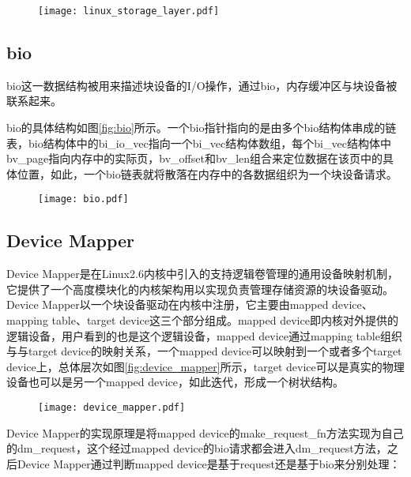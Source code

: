 \begin{figure}[H]
    \centering
    \texttt{[image: linux\_storage\_layer.pdf]}
\end{figure}

\subsection{bio}
\label{sec:bio}

bio这一数据结构被用来描述块设备的I/O操作，通过bio，内存缓冲区与块设备被联系起来\cite{corbet2005linux}。

bio的具体结构如图\ref{fig:bio}所示。一个bio指针指向的是由多个bio结构体串成的链表，bio结构体中的bi\_io\_vec指向一个bi\_vec结构体数组，每个bi\_vec结构体中bv\_page指向内存中的实际页，bv\_offset和bv\_len组合来定位数据在该页中的具体位置，如此，一个bio链表就将散落在内存中的各数据组织为一个块设备请求。

\begin{figure}[H]
    \centering
    \texttt{[image: bio.pdf]}
\end{figure}

\subsection{Device Mapper}

Device Mapper是在Linux2.6内核中引入的支持逻辑卷管理的通用设备映射机制，它提供了一个高度模块化的内核架构用以实现负责管理存储资源的块设备驱动\cite{bovet2005understanding}。Device Mapper以一个块设备驱动在内核中注册，它主要由mapped device、mapping table、target device这三个部分组成。mapped device即内核对外提供的逻辑设备，用户看到的也是这个逻辑设备，mapped device通过mapping table组织与与target device的映射关系，一个mapped device可以映射到一个或者多个target device上，总体层次如图\ref{fig:device_mapper}所示，target device可以是真实的物理设备也可以是另一个mapped device，如此迭代，形成一个树状结构。

\begin{figure}[!htbp]
    \centering
    \texttt{[image: device\_mapper.pdf]}
\end{figure}

Device Mapper的实现原理是将mapped device的make\_request\_fn方法实现为自己的dm\_request，这个经过mapped device的bio请求都会进入dm\_request方法，之后Device Mapper通过判断mapped device是基于request还是基于bio来分别处理：

